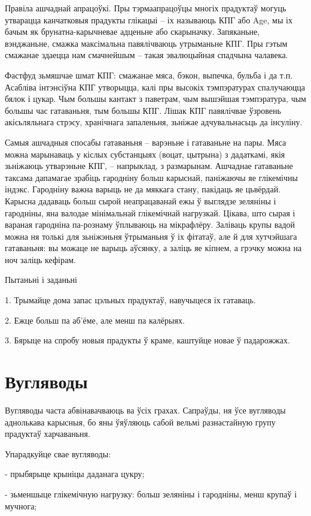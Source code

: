 Правіла ашчаднай апрацоўкі. Пры тэрмаапрацоўцы многіх прадуктаў могуць утварацца канчатковыя прадукты глікацыі – іх называюць КПГ або Age, мы іх бачым як брунатна-карычневае адценьне або скарыначку. Запяканьне, вэнджаньне, смажка максімальна павялічваюць утрыманьне КПГ. Пры гэтым смажанае здаецца нам смачнейшым – такая эвалюцыйная спадчына чалавека.

Фастфуд зьмяшчае шмат КПГ: смажанае мяса, бэкон, выпечка, бульба і да т.п. Асабліва інтэнсіўна КПГ утворыцца, калі пры высокіх тэмпэратурах спалучаюцца бялок і цукар. Чым большы кантакт з паветрам, чым вышэйшая тэмпэратура, чым большы час гатаваньня, тым большы КПГ. Лішак КПГ павялічвае ўзровень акісьляльнага стрэсу, хранічнага запаленьня, зьніжае адчувальнасьць да інсуліну.

Самыя ашчадныя спосабы гатаваньня – варэньне і гатаваньне на пары. Мяса можна марынаваць у кіслых субстанцыях (воцат, цытрына) з дадаткамі, якія зьніжаюць утварэньне КПГ, -- напрыклад, з размарынам. Ашчаднае гатаваньне таксама дапамагае зрабіць гародніну больш карыснай, паніжаючы яе глікемічны індэкс. Гародніну важна варыць не да мяккага стану, пакідаць яе цьвёрдай. Карысна дадаваць больш сырой неапрацаванай ежы ў выглядзе зеляніны і гародніны, яна валодае мінімальнай глікемічнай нагрузкай. Цікава, што сырая і вараная гародніна па-рознаму ўплываюць на мікрафлёру. Заліваць крупы вадой можна ня толькі для зьніжэньня ўтрыманьня ў іх фітатаў, але й для хутчэйшага гатаваньня: вы можаце не варыць аўсянку, а заліць яе кіпнем, а грэчку можна на ноч заліць кефірам.

Пытаньні і заданьні

1. Трымайце дома запас цэльных прадуктаў, навучыцеся іх гатаваць.

2. Ежце больш па аб'ёме, але менш па калёрыях.

3. Бярыце на спробу новыя прадукты ў краме, каштуйце новае ў падарожжах.


\section{Вугляводы}

Вугляводы часта абвінавачваюць ва ўсіх грахах. Сапраўды, ня ўсе вугляводы аднолькава карысныя, бо яны ўяўляюць сабой вельмі разнастайную групу прадуктаў харчаваньня.

Упарадкуйце свае вугляводы:

- прыбярыце крыніцы даданага цукру;

- зьменшыце глікемічную нагрузку: больш зеляніны і гародніны, менш крупаў і мучнога;

